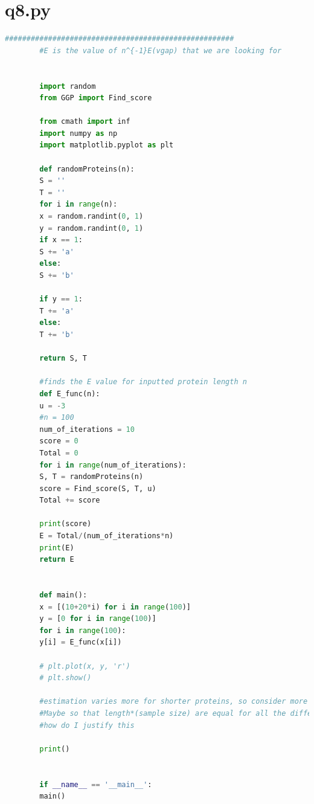 \documentclass{article}
\begin{document}
	\section{q8.py}
	\label{ap:q8}
	\begin{lstlisting}[language=python]
		#####################################################
		#E is the value of n^{-1}E(vgap) that we are looking for
		
		
		import random
		from GGP import Find_score
		
		from cmath import inf
		import numpy as np
		import matplotlib.pyplot as plt
		
		def randomProteins(n):
		S = ''
		T = ''
		for i in range(n):
		x = random.randint(0, 1)
		y = random.randint(0, 1)
		if x == 1:
		S += 'a'
		else:
		S += 'b'
		
		if y == 1:
		T += 'a'
		else:
		T += 'b'
		
		return S, T
		
		#finds the E value for inputted protein length n
		def E_func(n):
		u = -3
		#n = 100
		num_of_iterations = 10
		score = 0
		Total = 0
		for i in range(num_of_iterations):
		S, T = randomProteins(n)
		score = Find_score(S, T, u)
		Total += score
		
		print(score)
		E = Total/(num_of_iterations*n)
		print(E)
		return E
		
		
		def main():
		x = [(10+20*i) for i in range(100)]
		y = [0 for i in range(100)]
		for i in range(100):
		y[i] = E_func(x[i])
		
		# plt.plot(x, y, 'r')
		# plt.show()
		
		#estimation varies more for shorter proteins, so consider more samples for shorter proteins and less samples for longer proteins?
		#Maybe so that length*(sample size) are equal for all the different lengths of proteins.
		#how do I justify this
		
		print()
		
		
		if __name__ == '__main__':
		main()
	\end{lstlisting}
\end{document}
